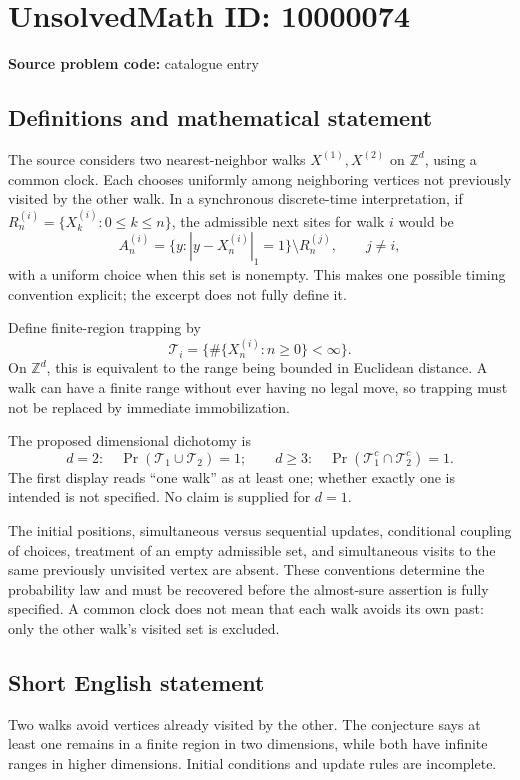 \documentclass[11pt]{article}
\newcommand{\Z}{\mathbb{Z}}
\begin{document}
\section*{UnsolvedMath ID: 10000074}
\textbf{Source problem code:} catalogue entry
\subsection{Definitions and mathematical statement}
The source considers two nearest-neighbor walks \(X^{(1)},X^{(2)}\) on \(\Z^d\), using a common clock. Each chooses uniformly among neighboring vertices not previously visited by the other walk. In a synchronous discrete-time interpretation, if \(R_n^{(i)}=\{X_k^{(i)}:0\leq k\leq n\}\), the admissible next sites for walk \(i\) would be
\[
 A_n^{(i)}=\{y:|y-X_n^{(i)}|_1=1\}\setminus R_n^{(j)},\qquad j\ne i,
\]
with a uniform choice when this set is nonempty. This makes one possible timing convention explicit; the excerpt does not fully define it.

Define finite-region trapping by
\[
 \mathcal T_i=\{\#\{X_n^{(i)}:n\geq0\}<\infty\}.
\]
On \(\Z^d\), this is equivalent to the range being bounded in Euclidean distance. A walk can have a finite range without ever having no legal move, so trapping must not be replaced by immediate immobilization.

The proposed dimensional dichotomy is
\[
 d=2:\quad\Pr(\mathcal T_1\cup\mathcal T_2)=1;
 \qquad d\geq3:\quad\Pr(\mathcal T_1^c\cap\mathcal T_2^c)=1.
\]
The first display reads ``one walk'' as at least one; whether exactly one is intended is not specified. No claim is supplied for \(d=1\).

The initial positions, simultaneous versus sequential updates, conditional coupling of choices, treatment of an empty admissible set, and simultaneous visits to the same previously unvisited vertex are absent. These conventions determine the probability law and must be recovered before the almost-sure assertion is fully specified. A common clock does not mean that each walk avoids its own past: only the other walk's visited set is excluded.
\subsection{Short English statement}
Two walks avoid vertices already visited by the other. The conjecture says at least one remains in a finite region in two dimensions, while both have infinite ranges in higher dimensions. Initial conditions and update rules are incomplete.
\end{document}
